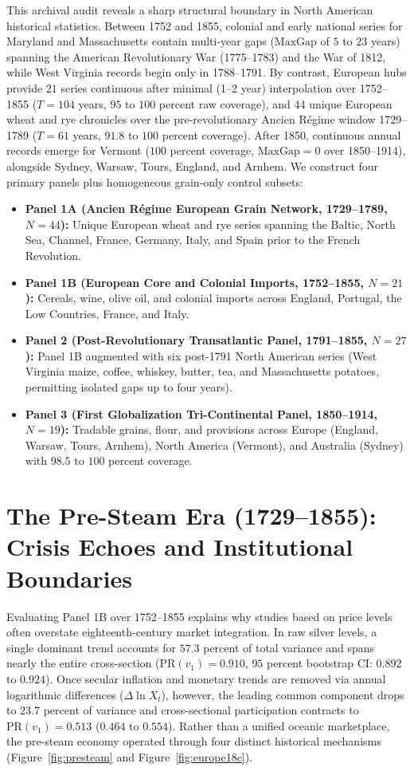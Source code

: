 \documentclass{article}
\begin{document}
This archival audit reveals a sharp structural boundary in North American historical statistics. Between 1752 and 1855, colonial and early national series for Maryland and Massachusetts contain multi-year gaps ($\text{MaxGap}$ of $5$ to $23$ years) spanning the American Revolutionary War (1775--1783) and the War of 1812, while West Virginia records begin only in 1788--1791. By contrast, European hubs provide $21$ series continuous after minimal (1--2 year) interpolation over 1752--1855 ($T = 104$ years, $95$ to $100$ percent raw coverage), and $44$ unique European wheat and rye chronicles over the pre-revolutionary Ancien R\'egime window 1729--1789 ($T = 61$ years, $91.8$ to $100$ percent coverage). After 1850, continuous annual records emerge for Vermont ($100$ percent coverage, $\text{MaxGap} = 0$ over 1850--1914), alongside Sydney, Warsaw, Tours, England, and Arnhem. We construct four primary panels plus homogeneous grain-only control subsets:
\begin{itemize}
    \item \textbf{Panel 1A (Ancien R\'egime European Grain Network, 1729--1789, $N=44$):} Unique European wheat and rye series spanning the Baltic, North Sea, Channel, France, Germany, Italy, and Spain prior to the French Revolution.
    \item \textbf{Panel 1B (European Core and Colonial Imports, 1752--1855, $N=21$):} Cereals, wine, olive oil, and colonial imports across England, Portugal, the Low Countries, France, and Italy.
    \item \textbf{Panel 2 (Post-Revolutionary Transatlantic Panel, 1791--1855, $N=27$):} Panel 1B augmented with six post-1791 North American series (West Virginia maize, coffee, whiskey, butter, tea, and Massachusetts potatoes, permitting isolated gaps up to four years).
    \item \textbf{Panel 3 (First Globalization Tri-Continental Panel, 1850--1914, $N=19$):} Tradable grains, flour, and provisions across Europe (England, Warsaw, Tours, Arnhem), North America (Vermont), and Australia (Sydney) with $98.5$ to $100$ percent coverage.
\end{itemize}

\section{The Pre-Steam Era (1729--1855): Crisis Echoes and Institutional Boundaries}
Evaluating Panel 1B over 1752--1855 explains why studies based on price levels often overstate eighteenth-century market integration. In raw silver levels, a single dominant trend accounts for $57.3$ percent of total variance and spans nearly the entire cross-section ($\mathrm{PR}(v_1) = 0.910$, $95$ percent bootstrap CI: $0.892$ to $0.924$). Once secular inflation and monetary trends are removed via annual logarithmic differences ($\Delta \ln X_t$), however, the leading common component drops to $23.7$ percent of variance and cross-sectional participation contracts to $\mathrm{PR}(v_1) = 0.513$ ($0.464$ to $0.554$). Rather than a unified oceanic marketplace, the pre-steam economy operated through four distinct historical mechanisms (Figure~\ref{fig:presteam} and Figure~\ref{fig:europe18c}).
\end{document}
